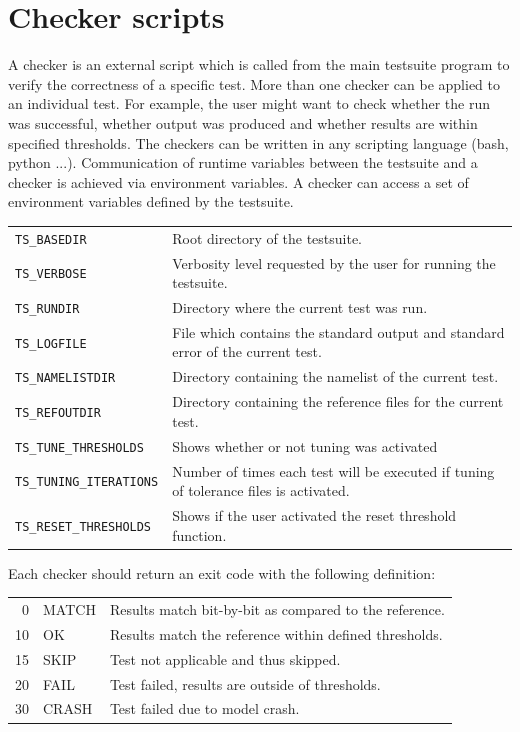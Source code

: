 \documentclass[12pt,twoside,a4paper]{report}
\begin{document}
\newpage
\section{Checker scripts}
\label{sec:checker}

A checker is an external script which is called from the main testsuite program to verify the correctness of a specific test. More than one checker can be applied to an individual test. For example, the user might want to check whether the run was successful, whether output was produced and whether results are within specified thresholds. The checkers can be written in any scripting language (bash, python ...). Communication of runtime variables between the testsuite and a checker is achieved via environment variables. A checker can access a set of environment variables defined by the testsuite.\\

\begin{tabular}{lp{10cm}}
\texttt{TS\_BASEDIR} & Root directory of the testsuite.\\[1.2ex]
\texttt{TS\_VERBOSE} & Verbosity level requested by the user for running the testsuite.\\[1.2ex]
\texttt{TS\_RUNDIR} & Directory where the current test was run.\\[1.2ex]
\texttt{TS\_LOGFILE} & File which contains the standard output and standard error of the current test.\\[1.2ex]
\texttt{TS\_NAMELISTDIR} & Directory containing the namelist of the current test.\\[1.2ex]
\texttt{TS\_REFOUTDIR} & Directory containing the reference files for the current test.\\[1.2ex]
\texttt{TS\_TUNE\_THRESHOLDS} & Shows whether or not tuning was activated\\[1.2ex]
\texttt{TS\_TUNING\_ITERATIONS} & Number of times each test will be executed if tuning of tolerance files is activated.\\[1.2ex]
\texttt{TS\_RESET\_THRESHOLDS} & Shows if the user activated the reset threshold function.\\[1.2ex]
\end{tabular}

Each checker should return an exit code with the following definition:\\

\begin{tabular}{rlp{10cm}}
0 & {\color{green} MATCH} & Results match bit-by-bit as compared to the reference.\\[1.2ex]
10 & {\color{green} OK} & Results match the reference within defined thresholds.\\[1.2ex]
15 & {\color{grey} SKIP} & Test not applicable and thus skipped.\\[1.2ex]
20 & {\color{red} FAIL} & Test failed, results are outside of thresholds.\\[1.2ex]
30 & {\color{red} CRASH} & Test failed due to model crash.\\[1.2ex]
\end{tabular}
\end{document}
